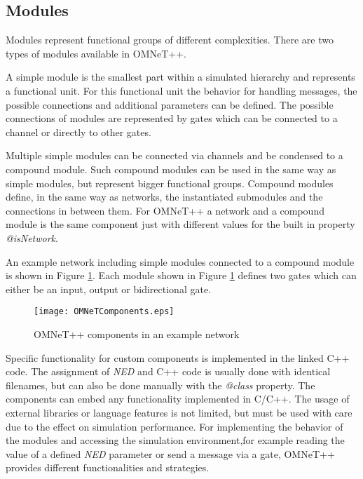 \subsection{Modules}
\label{sec:omnet_components_modules}
Modules represent functional groups of different complexities.
There are two types of modules available in OMNeT++.

A simple module is the smallest part within a simulated hierarchy and represents a functional unit.
For this functional unit the behavior for handling messages, the possible connections and additional parameters can be defined. \cite[section 3.3]{omnet_manual}
The possible connections of modules are represented by gates which can be connected to a channel or directly to other gates.

Multiple simple modules can be connected via channels and be condensed to a compound module.
Such compound modules can be used in the same way as simple modules, but represent bigger functional groups.
Compound modules define, in the same way as networks, the instantiated submodules and the connections in between them. \cite[section 3.4]{omnet_manual}
For OMNeT++ a network and a compound module is the same component just with different values for the built in property \emph{@isNetwork}.

An example network including simple modules connected to a compound module is shown in Figure \ref{fig:OMNeTComponents}.
Each module shown in Figure \ref{fig:OMNeTComponents} defines two gates which can either be an input, output or bidirectional gate.

\begin{figure}
    \centering
    \texttt{[image: OMNeTComponents.eps]}
    \caption{OMNeT++ components in an example network}
    \label{fig:OMNeTComponents}
\end{figure}

Specific functionality for custom components is implemented in the linked C++ code.
The assignment of \emph{NED} and C++ code is usually done with identical filenames, but can also be done manually with the \emph{@class} property.
The components can embed any functionality implemented in C/C++.
The usage of external libraries or language features is not limited, but must be used with care due to the effect on simulation performance.
For implementing the behavior of the modules and accessing the simulation environment,for example reading the value of a defined \emph{NED} parameter or send a message via a gate, 
OMNeT++ provides different functionalities and strategies.

